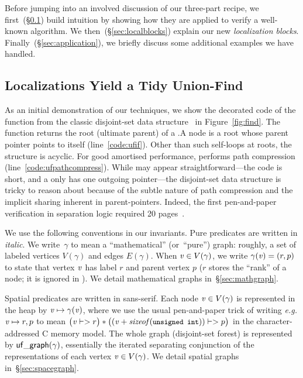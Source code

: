 Before jumping into an involved discussion of our three-part recipe, 
we first~(\S\ref{sec:unionfind}) build intuition by showing how 
they are applied to verify a well-known algorithm. 
We then~(\S\ref{sec:localblocks}) explain our new \emph{localization blocks}. 
Finally~(\S\ref{sec:application}), we briefly discuss some additional 
examples we have handled. 


\subsection{Localizations Yield a Tidy Union-Find}
\label{sec:unionfind}



As an initial demonstration of our techniques, we show the decorated code of the
 function from the classic disjoint-set data structure~\cite{clrs} in
Figure~\ref{fig:find}. The function returns the root
(ultimate parent) of a .\hspace{0.5em}A node is a root whose parent
pointer points to itself (line~\ref{code:ufif}).
Other than such self-loops at roots, the structure is acyclic.
For good amortised performance,  performs path
compression (line~\ref{code:ufpathcompress}).
While  may appear straightforward---the code is short, 
and a  only has one outgoing pointer---the
disjoint-set data structure is tricky to reason about 
because of the subtle nature of path compression and the
implicit sharing inherent in parent-pointers. Indeed, the first pen-and-paper
verification in separation logic required 20 pages~\cite{neelthesis}.

We use the following conventions in our invariants.  Pure predicates are written in
\textit{italic}.  We write~$\gamma$ to
mean a ``mathematical'' (or~``pure'') graph: roughly, a set of
labeled vertices $V(\gamma)$ and edges $E(\gamma)$.
When $\mathit{v} \in V(\gamma)$, we write $\gamma(\mathit{v}) = (r,p)$ to state that vertex $\mathit{v}$ has
label $r$ and parent vertex $p$ ($r$ stores the ``rank'' of a node; it is ignored
in ).  We detail mathematical graphs in~\S\ref{sec:mathgraph}.

Spatial predicates are written in \textsf{sans-serif}.
Each node $\mathit{v} \in V(\gamma)$ is
represented in the heap by $\mathit{v} \mapsto \gamma(\mathit{v})$, %
where we use the usual pen-and-paper
trick of writing \emph{e.g.} $\mathit{v} \mapsto r,p$ to mean
\mbox{$\big(\m{v} |-> r\big) * \big((\m{v} + \m{sizeof}(\li{unsigned int})) |-> p\big)$} in the character-addressed C memory model.
The whole graph (disjoint-set forest) is represented by
$\mathsf{uf\_graph}(\gamma)$, essentially the
iterated separating conjunction of the representations
of each vertex $\mathit{v} \in V(\gamma)$.
We detail spatial graphs in~\S\ref{sec:spacegraph}.

